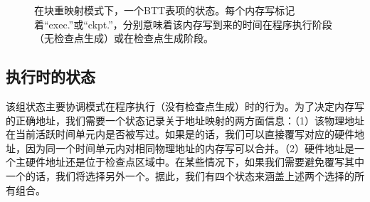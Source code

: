\begin{figure}[!t]
\centering

\caption{在块重映射模式下，一个BTT表项的状态。每个内存写标记着``exec.''或``ckpt.''，分别意味着该内存写到来的时间在程序执行阶段（无检查点生成）或在检查点生成阶段。}
\label{fig-state-machine}
\end{figure}

\subsection{执行时的状态}

该组状态主要协调模式在程序执行（没有检查点生成）时的行为。为了决定内存写的正确地址，我们需要一个状态记录关于地址映射的两方面信息：（1）该物理地址在当前活跃时间单元内是否被写过。如果是的话，我们可以直接覆写对应的硬件地址，因为同一个时间单元内对相同物理地址的内存写可以合并。（2）硬件地址是一个主硬件地址还是位于检查点区域中。在某些情况下，如果我们需要避免覆写其中一个的话，我们将选择另外一个。据此，我们有四个状态来涵盖上述两个选择的所有组合。


